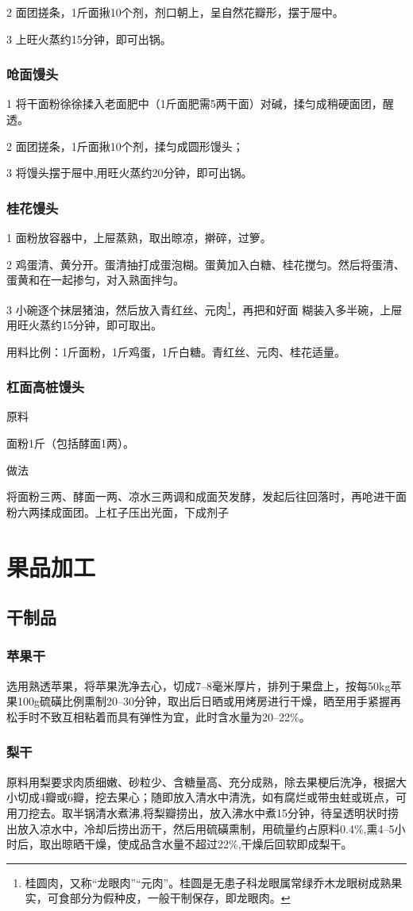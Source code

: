\documentclass{ctexbook}
\begin{document}
2 面团搓条，1斤面揪10个剂，剂口朝上，呈自然花瓣形，摆于屉中。

3 上旺火蒸约15分钟，即可出锅。
\subsection{呛面馒头}
1 将干面粉徐徐揉入老面肥中（1斤面肥需5两干面）对碱，揉匀成稍硬面团，醒透。

2 面团搓条，1斤面揪10个剂，揉匀成圆形馒头；

3 将馒头摆于屉中,用旺火蒸约20分钟，即可出锅。
\subsection{桂花馒头}
1 面粉放容器中，上屉蒸熟，取出晾凉，擀碎，过箩。

2 鸡蛋清、黄分开。蛋清抽打成蛋泡糊。蛋黄加入白糖、桂花搅匀。然后将蛋清、蛋黄和在一起掺匀，对入熟面拌匀。

3 小碗逐个抹层猪油，然后放入青红丝、元肉\footnote{桂圆肉，又称“龙眼肉”“元肉”。桂圆是无患子科龙眼属常绿乔木龙眼树成熟果实，可食部分为假种皮，一般干制保存，即龙眼肉。}，再把和好面
糊装入多半碗，上屉用旺火蒸约15分钟，即可取出。

用料比例：1斤面粉，1斤鸡蛋，1斤白糖。青红丝、元肉、桂花适量。

\subsection{杠面高桩馒头}
原料

面粉1斤（包括酵面1两）。

做法

将面粉三两、酵面一两、凉水三两调和成面芡发酵，发起后往回落时，再呛进干面粉六两揉成面团。上杠子压出光面，下成剂子

\chapter{果品加工}
\section{干制品}
\subsection{苹果干}
选用熟透苹果，将苹果洗净去心，切成7--8毫米厚片，排列于果盘上，按每50kg苹果100g硫磺比例熏制20--30分钟，取出后日晒或用烤房进行干燥，晒至用手紧握再松手时不致互相粘着而具有弹性为宜，此时含水量为20--22\%。
\subsection{梨干}
原料用梨要求肉质细嫩、砂粒少、含糖量高、充分成熟，除去果梗后洗净，根据大小切成4瓣或6瓣，挖去果心；随即放入清水中清洗，如有腐烂或带虫蛀或斑点，可用刀挖去。取半锅清水煮沸,将梨瓣捞出，放入沸水中煮15分钟，待呈透明状时捞出放入凉水中，冷却后捞出沥干，然后用硫磺熏制，用硫量约占原料0.4\%,熏4--5小时后，取出晾晒干燥，使成品含水量不超过22\%,干燥后回软即成梨干。
\end{document}
